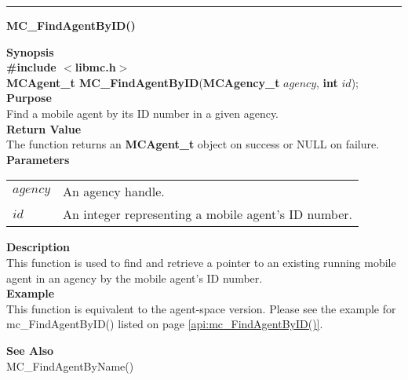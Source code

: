 \noindent
\vspace{5pt}
\rule{6.5in}{0.015in}
\noindent
{\LARGE \bf MC\_FindAgentByID()}\\
{}

\noindent
{\bf Synopsis}\\
{\bf \#include $<$libmc.h$>$}\\
{\bf MCAgent\_t MC\_FindAgentByID}({\bf MCAgency\_t} $agency$, {\bf int} $id$);\\

\noindent
{\bf Purpose}\\
Find a mobile agent by its ID number in a given agency.\\

\noindent
{\bf Return Value}\\
The function returns an {\bf MCAgent\_t} object on success or NULL on failure.\\

\noindent
{\bf Parameters}
\vspace{-0.1in}
\begin{description}
\item               
\begin{tabular}{p{10 mm}p{145 mm}}
$agency$ & An agency handle.\\
$id$ & An integer representing a mobile agent's ID number.
\end{tabular}
\end{description}

\noindent
{\bf Description}\\
This function is used to find and retrieve a pointer to an existing running 
mobile agent in an agency by the mobile agent's ID number.\\

\noindent
{\bf Example}\\
This function is equivalent to the agent-space version. Please see the
example for mc\_FindAgentByID() listed on page \vref{api:mc_FindAgentByID()}.
\noindent

\noindent
{\bf See Also}\\
MC\_FindAgentByName()

